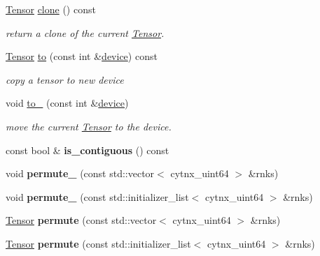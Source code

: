 \begin{DoxyCompactItemize}
\hyperlink{classcytnx_1_1Tensor}{Tensor} \hyperlink{classcytnx_1_1Tensor_a5e2248e9babdb786167ed349df9084ae}{clone} () const
\begin{DoxyCompactList}\small\item\em return a clone of the current \hyperlink{classcytnx_1_1Tensor}{Tensor}. \end{DoxyCompactList}\item 
\hyperlink{classcytnx_1_1Tensor}{Tensor} \hyperlink{classcytnx_1_1Tensor_acf7f697a9434f9bc98a7d00a555ee982}{to} (const int \&\hyperlink{classcytnx_1_1Tensor_ac6d3310eb4defbdacf662dcd81d8fe09}{device}) const
\begin{DoxyCompactList}\small\item\em copy a tensor to new device \end{DoxyCompactList}\item 
void \hyperlink{classcytnx_1_1Tensor_a114a31fbb8bf4a90f150b6a67e42183a}{to\+\_\+} (const int \&\hyperlink{classcytnx_1_1Tensor_ac6d3310eb4defbdacf662dcd81d8fe09}{device})
\begin{DoxyCompactList}\small\item\em move the current \hyperlink{classcytnx_1_1Tensor}{Tensor} to the device. \end{DoxyCompactList}\item 
\mbox{\label{classcytnx_1_1Tensor_a6a1d9ed962b0e9a484e2bb0de15eb76d}} 
const bool \& {\bfseries is\+\_\+contiguous} () const
\item 
\mbox{\label{classcytnx_1_1Tensor_a18f27d1fff73e4fb4109bc8faf3b5ace}} 
void {\bfseries permute\+\_\+} (const std\+::vector$<$ cytnx\+\_\+uint64 $>$ \&rnks)
\item 
\mbox{\label{classcytnx_1_1Tensor_a675d2a131c8c49fe748525edf21cab1e}} 
void {\bfseries permute\+\_\+} (const std\+::initializer\+\_\+list$<$ cytnx\+\_\+uint64 $>$ \&rnks)
\item 
\mbox{\label{classcytnx_1_1Tensor_a6bab89872014cf91dba63b38d9a2b3ea}} 
\hyperlink{classcytnx_1_1Tensor}{Tensor} {\bfseries permute} (const std\+::vector$<$ cytnx\+\_\+uint64 $>$ \&rnks)
\item 
\mbox{\label{classcytnx_1_1Tensor_a436838e8123d399c42e2de08ee46d687}} 
\hyperlink{classcytnx_1_1Tensor}{Tensor} {\bfseries permute} (const std\+::initializer\+\_\+list$<$ cytnx\+\_\+uint64 $>$ \&rnks)

\end{DoxyCompactItemize}
